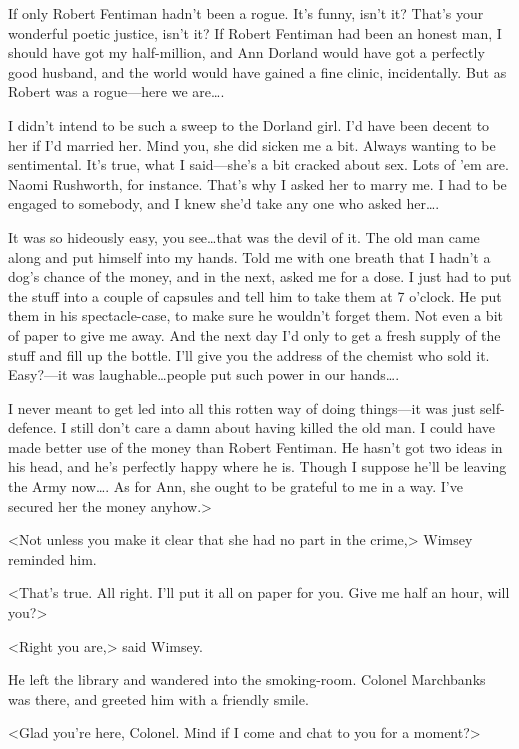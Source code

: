 If only Robert Fentiman hadn't been a rogue. It's funny, isn't it? That's your wonderful poetic justice, isn't it? If Robert Fentiman had been an honest man, I should have got my half-million, and Ann Dorland would have got a perfectly good husband, and the world would have gained a fine clinic, incidentally. But as Robert was a rogue—here we are\dots.

I didn't intend to be such a sweep to the Dorland girl. I'd have been decent to her if I'd married her. Mind you, she did sicken me a bit. Always wanting to be sentimental. It's true, what I said—she's a bit cracked about sex. Lots of 'em are. Naomi Rushworth, for instance. That's why I asked her to marry me. I had to be engaged to somebody, and I knew she'd take any one who asked her\dots.

It was so hideously easy, you see\dots that was the devil of it. The old man came along and put himself into my hands. Told me with one breath that I hadn't a dog's chance of the money, and in the next, asked me for a dose. I just had to put the stuff into a couple of capsules and tell him to take them at 7 o'clock. He put them in his spectacle-case, to make sure he wouldn't forget them. Not even a bit of paper to give me away. And the next day I'd only to get a fresh supply of the stuff and fill up the bottle. I'll give you the address of the chemist who sold it. Easy?—it was laughable\dots people put such power in our hands\dots .

I never meant to get led into all this rotten way of doing things—it was just self-defence. I still don't care a damn about having killed the old man. I could have made better use of the money than Robert Fentiman. He hasn't got two ideas in his head, and he's perfectly happy where he is. Though I suppose he'll be leaving the Army now\dots . As for Ann, she ought to be grateful to me in a way. I've secured her the money anyhow.>

<Not unless you make it clear that she had no part in the crime,> Wimsey reminded him.

<That's true. All right. I'll put it all on paper for you. Give me half an hour, will you?>

<Right you are,> said Wimsey.

He left the library and wandered into the smoking-room. Colonel Marchbanks was there, and greeted him with a friendly smile.

<Glad you're here, Colonel. Mind if I come and chat to you for a moment?>

